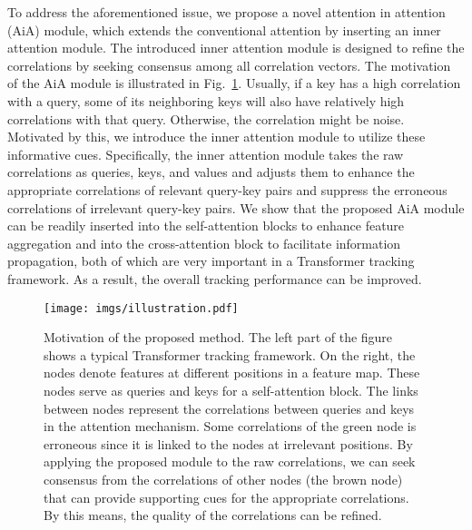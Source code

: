 To address the aforementioned issue, we propose a novel attention in attention (AiA) module, which extends the conventional attention \cite{vaswani2017attention} by inserting an inner attention module. The introduced inner attention module is designed to refine the correlations by seeking consensus among all correlation vectors. The motivation of the AiA module is illustrated in Fig.~\ref{figure-illustration}. Usually, if a key has a high correlation with a query, some of its neighboring keys will also have relatively high correlations with that query. Otherwise, the correlation might be noise. Motivated by this, we introduce the inner attention module to utilize these informative cues. Specifically, the inner attention module takes the raw correlations as queries, keys, and values and adjusts them to enhance the appropriate correlations of relevant query-key pairs and suppress the erroneous correlations of irrelevant query-key pairs. We show that the proposed AiA module can be readily inserted into the self-attention blocks to enhance feature aggregation and into the cross-attention block to facilitate information propagation, both of which are very important in a Transformer tracking framework. As a result, the overall tracking performance can be improved.


\begin{figure}[t]
\centering
\texttt{[image: imgs/illustration.pdf]}
\caption{Motivation of the proposed method. The left part of the figure shows a typical Transformer tracking framework. On the right, the nodes denote features at different positions in a feature map. These nodes serve as queries and keys for a self-attention block. The links between nodes represent the correlations between queries and keys in the attention mechanism. Some correlations of the \textcolor{node1}{green} node is \textcolor{link1}{erroneous} since it is linked to the nodes at irrelevant positions. By applying the proposed module to the raw correlations, we can seek consensus from the correlations of other nodes (\eg the \textcolor{node2}{brown} node) that can provide supporting cues for the \textcolor{link2}{appropriate} correlations. By this means, the quality of the correlations can be refined.}
\label{figure-illustration}
\end{figure}


